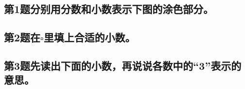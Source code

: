 \subsection*{第1题\quad 分别用分数和小数表示下图的涂色部分。}
\subsection*{第2题\quad 在$\square$里填上合适的小数。}
\subsection*{第3题\quad 先读出下面的小数，再说说各数中的“3”表示的意思。}
